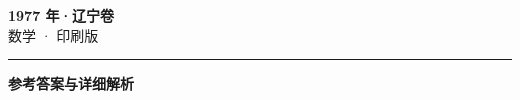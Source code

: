 \documentclass[zihao=5, a4paper]{ctexart}
\begin{document}
\begin{center}
  {\Large\bfseries 1977 年·辽宁卷}\\[4pt]
  {\large 数学 · 印刷版}
\end{center}
\medskip
{}

\par\bigskip\hrule\bigskip
{}
\begin{center}{\large\bfseries 参考答案与详细解析}\end{center}
\smallskip

\end{document}
